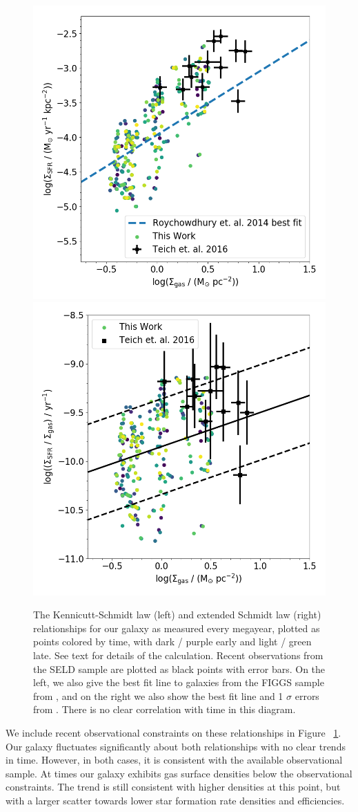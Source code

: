 \documentclass[twocolumn]{aastex61}
\begin{document}
\begin{figure}
\centering
\includegraphics[width=0.475\linewidth]{all_gas_schmidt_law_evolution}
\includegraphics[width=0.475\linewidth]{all_gass_efficiency_evolution}
\caption{The Kennicutt-Schmidt law (left) and extended Schmidt law (right) relationships for our galaxy as measured every megayear, plotted as points colored by time, with dark / purple early and light / green late. See text for details of the calculation.
Recent observations from the SELD sample \citep{Teich2016} are plotted as black points with error bars. On the left, we also give the best fit line to galaxies from the FIGGS sample from \cite{Roychowdhury2014}, and on the right we also show the best fit line and 1 $\sigma$ errors from \cite{Shi2011}.   There is no clear correlation with time in this diagram.}
\label{fig:KS}
\end{figure}

We include recent observational constraints on these relationships in Figure ~\ref{fig:KS}. Our galaxy fluctuates significantly about both relationships with no clear trends in time. However, in both cases, it is consistent with the available observational sample. At times our galaxy exhibits gas surface densities below the observational constraints. The trend is still consistent with higher densities at this point, but with a larger scatter towards lower star formation rate densities and efficiencies.
\end{document}
